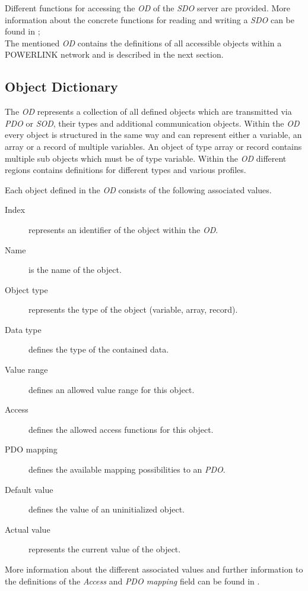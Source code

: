 Different functions for accessing the \emph{OD} of the \emph{SDO} server are provided.
More information about the concrete functions for reading and writing a \emph{SDO} can be found in \cite[section 6.3.2.4.2]{epsg_epsg_2013};
\\

The mentioned \emph{OD} contains the definitions of all accessible objects within a POWERLINK network and is described in the next section.

\subsection{Object Dictionary}
\label{sec:oplk_powerlink_object_dictionary}
The \emph{OD} represents a collection of all defined objects which are transmitted via \emph{PDO} or \emph{SOD}, their types and additional communication objects.
Within the \emph{OD} every object is structured in the same way and can represent either a variable, an array or a record of multiple variables.
An object of type array or record contains multiple sub objects which must be of type variable.
Within the \emph{OD} different regions contains definitions for different types and various profiles. \cite[section 2.2.2]{epsg_epsg_2013}

Each object defined in the \emph{OD} consists of the following associated values.

\begin{description}
    \item[Index] represents an identifier of the object within the \emph{OD}.
    \item[Name] is the name of the object.
    \item[Object type] represents the type of the object (variable, array, record).
    \item[Data type] defines the type of the contained data.
    \item[Value range] defines an allowed value range for this object.
    \item[Access] defines the allowed access functions for this object.
    \item[PDO mapping] defines the available mapping possibilities to an \emph{PDO}.
    \item[Default value] defines the value of an uninitialized object.
    \item[Actual value] represents the current value of the object.
\end{description}

More information about the different associated values and further information to the definitions of the \emph{Access} and \emph{PDO mapping} field can be found in \cite{openpowerlink_od_object}.
\\

